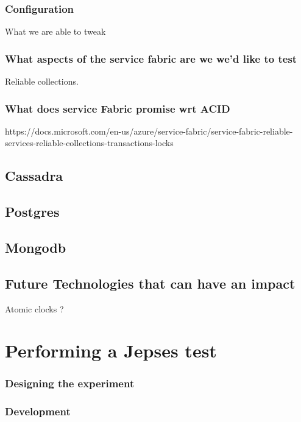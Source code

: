 \documentclass[a4paper,10pt,titlepage]{report}
\begin{document}
\subsection{Configuration}


What we are able to tweak


\subsection{What aspects of the service fabric are we  we'd like to test}

Reliable collections.

\subsection{What does service Fabric promise wrt ACID}

https://docs.microsoft.com/en-us/azure/service-fabric/service-fabric-reliable-services-reliable-collections-transactions-locks

\section{Cassadra}

\section{Postgres}

\section{Mongodb}

\section{Future Technologies that can have an impact}
 Atomic clocks ?    




\chapter{Performing a Jepses test}

\subsection{Designing the experiment}

\subsection{Development}
\end{document}
